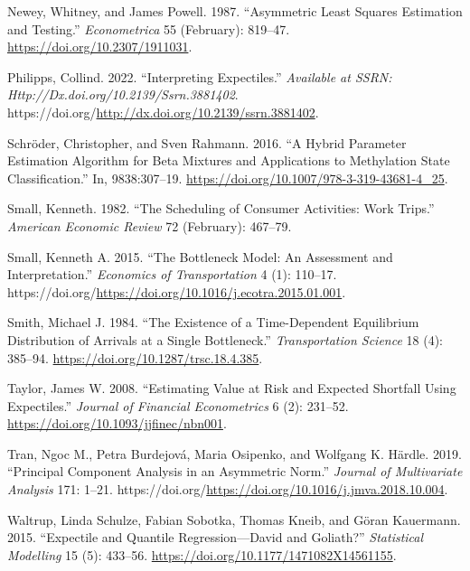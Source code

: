 \documentclass[
]{article}
\newlength{\cslhangindent}
\newlength{\cslentryspacingunit} %
\newenvironment{CSLReferences}[2] %
 {%
  \setlength{\parindent}{0pt}
  \ifodd #1
  \let\oldpar\par
  \def\par{\hangindent=\cslhangindent\oldpar}
  \fi
  \setlength{\parskip}{#2\cslentryspacingunit}
 }%
 {}
\theoremstyle{definition}
\theoremstyle{definition}
\theoremstyle{definition}
\theoremstyle{definition}
\theoremstyle{remark}
\begin{document}
\begin{CSLReferences}{1}{0}
\leavevmode{}%
Newey, Whitney, and James Powell. 1987. {``Asymmetric Least Squares Estimation and Testing.''} \emph{Econometrica} 55 (February): 819--47. \url{https://doi.org/10.2307/1911031}.

\leavevmode{}%
Philipps, Collind. 2022. {``Interpreting Expectiles.''} \emph{Available at SSRN: Http://Dx.doi.org/10.2139/Ssrn.3881402}. https://doi.org/\url{http://dx.doi.org/10.2139/ssrn.3881402}.

\leavevmode{}%
Schröder, Christopher, and Sven Rahmann. 2016. {``A Hybrid Parameter Estimation Algorithm for Beta Mixtures and Applications to Methylation State Classification.''} In, 9838:307--19. \url{https://doi.org/10.1007/978-3-319-43681-4_25}.

\leavevmode{}%
Small, Kenneth. 1982. {``The Scheduling of Consumer Activities: Work Trips.''} \emph{American Economic Review} 72 (February): 467--79.

\leavevmode{}%
Small, Kenneth A. 2015. {``The Bottleneck Model: An Assessment and Interpretation.''} \emph{Economics of Transportation} 4 (1): 110--17. https://doi.org/\url{https://doi.org/10.1016/j.ecotra.2015.01.001}.

\leavevmode{}%
Smith, Michael J. 1984. {``The Existence of a Time-Dependent Equilibrium Distribution of Arrivals at a Single Bottleneck.''} \emph{Transportation Science} 18 (4): 385--94. \url{https://doi.org/10.1287/trsc.18.4.385}.

\leavevmode{}%
Taylor, James W. 2008. {``{Estimating Value at Risk and Expected Shortfall Using Expectiles}.''} \emph{Journal of Financial Econometrics} 6 (2): 231--52. \url{https://doi.org/10.1093/jjfinec/nbn001}.

\leavevmode{}%
Tran, Ngoc M., Petra Burdejová, Maria Osipenko, and Wolfgang K. Härdle. 2019. {``Principal Component Analysis in an Asymmetric Norm.''} \emph{Journal of Multivariate Analysis} 171: 1--21. https://doi.org/\url{https://doi.org/10.1016/j.jmva.2018.10.004}.

\leavevmode{}%
Waltrup, Linda Schulze, Fabian Sobotka, Thomas Kneib, and Göran Kauermann. 2015. {``Expectile and Quantile Regression---David and Goliath?''} \emph{Statistical Modelling} 15 (5): 433--56. \url{https://doi.org/10.1177/1471082X14561155}.


\end{CSLReferences}
\end{document}
